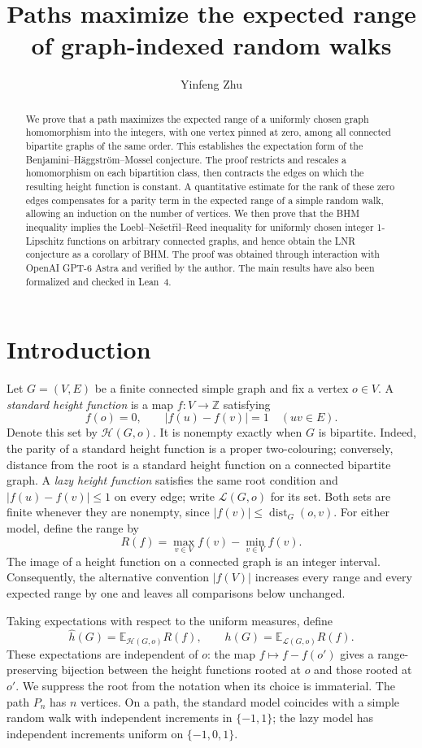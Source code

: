 \documentclass[11pt,reqno]{amsart}
\title[Expected ranges of graph-indexed random walks]{Paths maximize the expected range\texorpdfstring{\\}{ }of graph-indexed random walks}
\author{Yinfeng Zhu}
\date{}
\theoremstyle{remark}
\numberwithin{equation}{section}
\newcommand{\Z}{\mathbb Z}
\newcommand{\E}{\mathbb E}
\newcommand{\HH}{\mathcal H}
\newcommand{\LL}{\mathcal L}
\begin{document}
\begin{abstract}
We prove that a path maximizes the expected range of a uniformly chosen
graph homomorphism into the integers, with one vertex pinned at zero,
among all connected bipartite graphs of the same order. This establishes
the expectation form of the Benjamini--H\"aggstr\"om--Mossel conjecture.
The proof restricts and rescales a homomorphism on each bipartition class,
then contracts the edges on which the resulting height function is
constant. A quantitative estimate for the rank of these zero edges
compensates for a parity term in the expected range of a simple random
walk, allowing an induction on the number of vertices. We then prove
that the BHM inequality implies the Loebl--Ne\v set\v ril--Reed inequality
for uniformly chosen integer 1-Lipschitz functions on arbitrary connected
graphs, and hence obtain the LNR conjecture as a corollary of BHM.
The proof was obtained through interaction with OpenAI GPT-6 Astra
and verified by the author. The main results have also been formalized
and checked in Lean~4.
\end{abstract}
\maketitle

\section{Introduction}\label{sec:intro}

Let $G=(V,E)$ be a finite connected simple graph and fix a vertex $o\in V$.
A \emph{standard height function} is a map $f:V\to\Z$ satisfying
\[
 f(o)=0,\qquad |f(u)-f(v)|=1\quad(uv\in E).
\]
Denote this set by $\HH(G,o)$. It is nonempty exactly when $G$ is bipartite.
Indeed, the parity of a standard height function is a proper two-colouring;
conversely, distance from the root is a standard height function on a
connected bipartite graph.
A \emph{lazy height function} satisfies the same root condition and
$|f(u)-f(v)|\le1$ on every edge; write $\LL(G,o)$ for its set.
Both sets are finite whenever they are nonempty, since
$|f(v)|\le\operatorname{dist}_G(o,v)$.
For either model, define the range by
\[
 R(f)=\max_{v\in V}f(v)-\min_{v\in V}f(v).
\]
The image of a height function on a connected graph is an integer interval.
Consequently, the alternative convention $|f(V)|$ increases every range
and every expected range by one and leaves all comparisons below unchanged.

Taking expectations with respect to the uniform measures, define
\[
 \widehat h(G)=\E_{\HH(G,o)}R(f),\qquad
 h(G)=\E_{\LL(G,o)}R(f).
\]
These expectations are independent of $o$: the map $f\mapsto f-f(o')$
gives a range-preserving bijection between the height functions rooted
at $o$ and those rooted at $o'$.
We suppress the root from the notation when its choice is immaterial.
The path $P_n$ has $n$ vertices. On a path, the standard model coincides
with a simple random walk with independent increments in $\{-1,1\}$;
the lazy model has independent increments uniform on $\{-1,0,1\}$.
\end{document}
